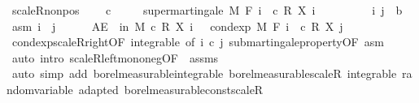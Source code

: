 \begin{isabellebody}
\endisatagproof
{\isafoldproof}%
%
\isadelimproof
\isanewline
%
\endisadelimproof
\isanewline
{}\isamarkupfalse%
\ scaleR{\isacharunderscore}{\kern0pt}nonpos{\isacharcolon}{\kern0pt}\ \isanewline
\ \ \ {\isachardoublequoteopen}c\ {\isasymle}\ {}{\isachardoublequoteclose}\isanewline
\ \ \ {\isachardoublequoteopen}supermartingale\ M\ F\ {\isacharparenleft}{\kern0pt}{\isasymlambda}i\ {\isasymxi}{\isachardot}{\kern0pt}\ c\ {\isacharasterisk}{\kern0pt}\isactrlsub R\ X\ i\ {\isasymxi}{\isacharparenright}{\kern0pt}{\isachardoublequoteclose}\isanewline
%
\isadelimproof
%
\endisadelimproof
%
\isatagproof
{}\isamarkupfalse%
\isanewline
\ \ \isacommand{{\isacharbraceleft}{\kern0pt}}\isamarkupfalse%
\isanewline
\ \ \ \ \isamarkupfalse%
\ i\ j\ {\isacharcolon}{\kern0pt}{\isacharcolon}{\kern0pt}\ {\isacharprime}{\kern0pt}b\ \isamarkupfalse%
\ asm{\isacharcolon}{\kern0pt}\ {\isachardoublequoteopen}i\ {\isasymle}\ j{\isachardoublequoteclose}\isanewline
\ \ \ \ \isamarkupfalse%
\ {\isachardoublequoteopen}AE\ {\isasymxi}\ in\ M{\isachardot}{\kern0pt}\ c\ {\isacharasterisk}{\kern0pt}\isactrlsub R\ X\ i\ {\isasymxi}\ {\isasymge}\ cond{\isacharunderscore}{\kern0pt}exp\ M\ {\isacharparenleft}{\kern0pt}F\ i{\isacharparenright}{\kern0pt}\ {\isacharparenleft}{\kern0pt}{\isasymlambda}{\isasymxi}{\isachardot}{\kern0pt}\ c\ {\isacharasterisk}{\kern0pt}\isactrlsub R\ X\ j\ {\isasymxi}{\isacharparenright}{\kern0pt}\ {\isasymxi}{\isachardoublequoteclose}\ \isanewline
\ \ \ \ \ \ \isamarkupfalse%
\ cond{\isacharunderscore}{\kern0pt}exp{\isacharunderscore}{\kern0pt}scaleR{\isacharunderscore}{\kern0pt}right{\isacharbrackleft}{\kern0pt}OF\ integrable{\isacharcomma}{\kern0pt}\ of\ i\ {\isachardoublequoteopen}c{\isachardoublequoteclose}\ j{\isacharbrackright}{\kern0pt}\ submartingale{\isacharunderscore}{\kern0pt}property{\isacharbrackleft}{\kern0pt}OF\ asm{\isacharbrackright}{\kern0pt}\ \isamarkupfalse%
\ {\isacharparenleft}{\kern0pt}auto\ intro{\isacharbang}{\kern0pt}{\isacharcolon}{\kern0pt}\ scaleR{\isacharunderscore}{\kern0pt}left{\isacharunderscore}{\kern0pt}mono{\isacharunderscore}{\kern0pt}neg{\isacharbrackleft}{\kern0pt}OF\ {\isacharunderscore}{\kern0pt}\ assms{\isacharbrackright}{\kern0pt}{\isacharparenright}{\kern0pt}\isanewline
\ \ \isacommand{{\isacharbraceright}{\kern0pt}}\isamarkupfalse%
\isanewline
{}\isamarkupfalse%
\ {\isacharparenleft}{\kern0pt}auto\ simp\ add{\isacharcolon}{\kern0pt}\ borel{\isacharunderscore}{\kern0pt}measurable{\isacharunderscore}{\kern0pt}integrable\ borel{\isacharunderscore}{\kern0pt}measurable{\isacharunderscore}{\kern0pt}scaleR\ integrable\ random{\isacharunderscore}{\kern0pt}variable\ adapted\ borel{\isacharunderscore}{\kern0pt}measurable{\isacharunderscore}{\kern0pt}const{\isacharunderscore}{\kern0pt}scaleR{\isacharparenright}{\kern0pt}%

\end{isabellebody}
